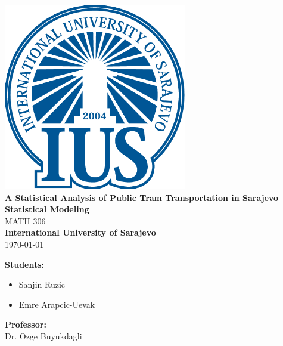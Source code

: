 \documentclass[a4paper, 10pt]{article}
\title{}
\author{}
\date{}
\begin{document}
	\begin{titlepage}
    \begin{center}
        \includegraphics[width=0.6\textwidth]{IUS_Logo.png} \\[1.5cm]

        {\Huge \textbf{A Statistical Analysis of Public Tram Transportation in Sarajevo}} \\[1.2cm]

        {\LARGE \textbf{Statistical Modeling}} \\[0.5cm]
        {\Large MATH 306} \\[2cm]

        {\Large \textbf{International University of Sarajevo}} \\[0.3cm]
        {\large \today}
    \end{center}

		\vfill

		\begin{minipage}[t]{0.4\textwidth}
			\begin{flushleft} \large
				\textbf{Students:} \\
				\begin{itemize}
					\item Sanjin Ruzic 
					\item Emre Arapcic-Uevak 
				\end{itemize}
			\end{flushleft}
		\end{minipage}
		\hfill
		\begin{minipage}[t]{0.4\textwidth}
			\begin{flushright} \large
				\textbf{Professor:} \\
				\vspace{3mm}
				Dr. Ozge Buyukdagli
			\end{flushright}
		\end{minipage}
	\end{titlepage}
	\pagebreak
	
\end{document}
